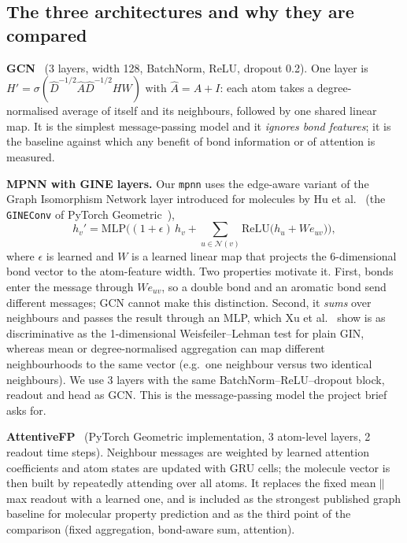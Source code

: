 \subsection{The three architectures and why they are compared}
\textbf{GCN}~\cite{kipf2017gcn} (3 layers, width 128, BatchNorm, ReLU, dropout 0.2). One layer is $H'=\sigma(\hat D^{-1/2}\hat A\hat D^{-1/2}HW)$ with $\hat A=A+I$: each atom takes a degree-normalised average of itself and its neighbours, followed by one shared linear map. It is the simplest message-passing model and it \emph{ignores bond features}; it is the baseline against which any benefit of bond information or of attention is measured.

\textbf{MPNN with GINE layers.} Our \texttt{mpnn} uses the edge-aware variant of the Graph Isomorphism Network layer introduced for molecules by Hu et al.~\cite{hu2020pretrain} (the \texttt{GINEConv} of PyTorch Geometric~\cite{fey2019pyg}),
\begin{equation}
h_v'=\mathrm{MLP}\Big((1+\epsilon)\,h_v+\sum_{u\in\mathcal N(v)}\mathrm{ReLU}\big(h_u+W e_{uv}\big)\Big),
\end{equation}
where $\epsilon$ is learned and $W$ is a learned linear map that projects the 6-dimensional bond vector to the atom-feature width. Two properties motivate it. First, bonds enter the message through $We_{uv}$, so a double bond and an aromatic bond send different messages; GCN cannot make this distinction. Second, it \emph{sums} over neighbours and passes the result through an MLP, which Xu et al.~\cite{xu2019gin} show is as discriminative as the 1-dimensional Weisfeiler--Lehman test for plain GIN, whereas mean or degree-normalised aggregation can map different neighbourhoods to the same vector (e.g.\ one neighbour versus two identical neighbours). We use 3 layers with the same BatchNorm--ReLU--dropout block, readout and head as GCN. This is the message-passing model the project brief asks for.

\textbf{AttentiveFP}~\cite{xiong2020attentivefp} (PyTorch Geometric implementation, 3 atom-level layers, 2 readout time steps). Neighbour messages are weighted by learned attention coefficients and atom states are updated with GRU cells; the molecule vector is then built by repeatedly attending over all atoms. It replaces the fixed mean$\|$max readout with a learned one, and is included as the strongest published graph baseline for molecular property prediction and as the third point of the comparison (fixed aggregation, bond-aware sum, attention).

